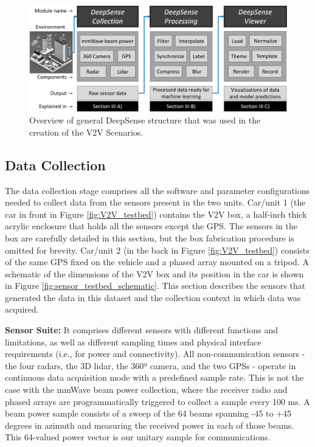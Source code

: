 \documentclass[10pt,comsoc]{IEEEtran}
\begin{document}
\begin{figure}[t]
	\centering
	\includegraphics[width=1\columnwidth]{overview_final}
	\caption{Overview of general DeepSense structure that was used in the creation of the V2V Scenarios.}
	\label{fig:deepsense_overview}
\end{figure}

\subsection{Data Collection} \label{subsec:Collection}

The data collection stage comprises all the software and parameter configurations needed to collect data from the sensors present in the two units. Car/unit 1 (the car in front in Figure \ref{fig:V2V_testbed}) contains the V2V box, a half-inch thick acrylic enclosure that holds all the sensors except the GPS. The sensors in the box are carefully detailed in this section, but the box fabrication procedure is omitted for brevity. Car/unit 2 (in the back in Figure \ref{fig:V2V_testbed}) consists of the same GPS fixed on the vehicle and a phased array mounted on a tripod. A schematic of the dimensions of the V2V box and its position in the car is shown in Figure \ref{fig:sensor_testbed_schematic}. This section describes the sensors that generated the data in this dataset and the collection context in which data was acquired. 

\textbf{Sensor Suite:} It comprises different sensors with different functions and limitations, as well as different sampling times and physical interface requirements (i.e., for power and connectivity). All non-communication sensors - the four radars, the 3D lidar, the 360º camera, and the two GPSs - operate in continuous data acquisition mode with a predefined sample rate. This is not the case with the mmWave beam power collection, where the receiver radio and phased arrays are programmatically triggered to collect a sample every 100 ms. A beam power sample consists of a sweep of the 64 beams spanning -45 to +45 degrees in azimuth and measuring the received power in each of those beams. This 64-valued power vector is our unitary sample for communications. 
\end{document}

